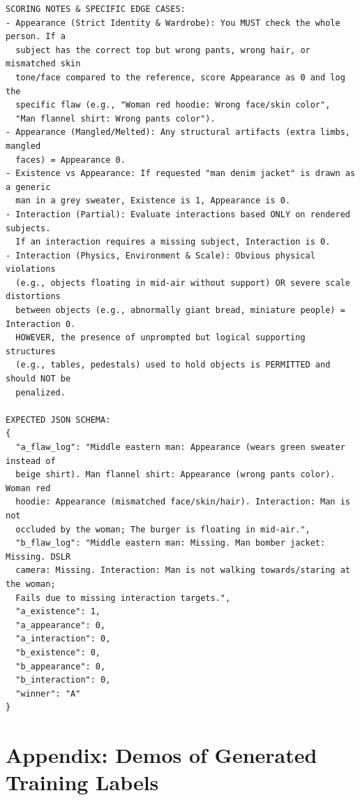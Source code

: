\documentclass{article}
\begin{document}
\begin{verbatim}
SCORING NOTES & SPECIFIC EDGE CASES:
- Appearance (Strict Identity & Wardrobe): You MUST check the whole person. If a
  subject has the correct top but wrong pants, wrong hair, or mismatched skin
  tone/face compared to the reference, score Appearance as 0 and log the
  specific flaw (e.g., "Woman red hoodie: Wrong face/skin color",
  "Man flannel shirt: Wrong pants color").
- Appearance (Mangled/Melted): Any structural artifacts (extra limbs, mangled
  faces) = Appearance 0.
- Existence vs Appearance: If requested "man denim jacket" is drawn as a generic
  man in a grey sweater, Existence is 1, Appearance is 0.
- Interaction (Partial): Evaluate interactions based ONLY on rendered subjects.
  If an interaction requires a missing subject, Interaction is 0.
- Interaction (Physics, Environment & Scale): Obvious physical violations
  (e.g., objects floating in mid-air without support) OR severe scale distortions
  between objects (e.g., abnormally giant bread, miniature people) = Interaction 0.
  HOWEVER, the presence of unprompted but logical supporting structures
  (e.g., tables, pedestals) used to hold objects is PERMITTED and should NOT be
  penalized.

EXPECTED JSON SCHEMA:
{
  "a_flaw_log": "Middle eastern man: Appearance (wears green sweater instead of
  beige shirt). Man flannel shirt: Appearance (wrong pants color). Woman red
  hoodie: Appearance (mismatched face/skin/hair). Interaction: Man is not
  occluded by the woman; The burger is floating in mid-air.",
  "b_flaw_log": "Middle eastern man: Missing. Man bomber jacket: Missing. DSLR
  camera: Missing. Interaction: Man is not walking towards/staring at the woman;
  Fails due to missing interaction targets.",
  "a_existence": 1,
  "a_appearance": 0,
  "a_interaction": 0,
  "b_existence": 0,
  "b_appearance": 0,
  "b_interaction": 0,
  "winner": "A"
}
\end{verbatim}

\newpage
\section{Appendix: Demos of Generated Training Labels}
\label{sec:app_SOP_demo}
\end{document}
